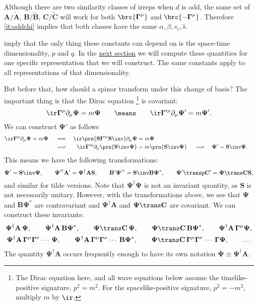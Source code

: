 \documentclass[11pt]{article}
\newcommand{\Gammab}{\boldsymbol{\Gamma}}
\renewcommand{\S}{\mathbf{S}}
\newcommand{\A}{\mathbf{A}}
\newcommand{\B}{\mathbf{B}}
\renewcommand{\C}{\mathbf{C}}
\newcommand{\At}{\widetilde{\A}}
\newcommand{\Bt}{\widetilde{\B}}
\newcommand{\Ct}{\widetilde{\C}}
\newcommand{\Psib}{\boldsymbol{\Psi}}
\begin{document}
Although there are two similarity classes of irreps when $d$ is odd, the same set of $\A/\At$, $\B/\Bt$, $\C/\Ct$ will work for both $\brc{\Gammab^\mu}$ and $\brc{ -\Gammab^\mu }$.
Therefore \cref{it:oddchi} implies that both classes have the same $\alpha, \beta, s_i, \hat{s}$.

 imply that the only thing these constants can depend on is the space-time dimensionality, $p$ and $q$.
In the \hyperref[sec:explicit]{next section} we will compute these quantities for one specific representation that we will construct.
The same constants apply to all representations of that dimensionality.

But before that, how should a spinor transform under this change of basis?
The important thing is that the Dirac equation%
\footnote{The Dirac equation here, and all wave equations below assume the timelike-positive signature, \(p^2 = m^2\).
For the spacelike-positive signature, \(p^2 = - m^2\), multiply \(m\) by \(\ir\).} 
is covariant:
%
\begin{equation*}
  \ir \Gammab^\mu \partial_\mu \Psib = m \Psib
  \qquad \means \qquad
  \ir \Gammab'^\mu \partial_\mu \Psib' = m \Psib'.
\end{equation*}
%
We can construct $\Psib'$ as follows
%
\begin{equation*}
\begin{aligned}
  \ir \Gammab^\mu \partial_\mu \Psib &= m \Psib &
  &\implies &
  \ir \prn{\S \Gammab'^\mu \S\inv} \partial_\mu \Psib &= m \Psib \\ &&
  &\implies &
  \ir \Gammab'^\mu \partial_\mu \prn{\S\inv\Psib} &= m \prn{\S\inv\Psib} &
  &\implies &
  \Psib' &= \S\inv \Psib.
\end{aligned}
\end{equation*}
%
This means we have the following transformations:
%
\begin{equation}\label{eq:spinorbasis}
  \Psib' = \S\inv \Psib, \qquad
  \Psib'^\dag \A' = \Psib^\dag \A \S, \qquad
  \B' \Psib'^\ast = \S\inv \B \Psib^\ast, \qquad
  \Psib'\transp \C' = \Psib\trans \C \S,
\end{equation}
%
and similar for tilde versions.
Note that $\Psib^\dag \Psib$ is not an invariant quantity, as \(\S\) is not necessarily unitary.
However, with the transformations above, we see that $\Psib$ and $\B \Psib^\ast$ are contravariant and $\Psib^\dag\A$ and $\Psib\trans \C$ are covariant.
We can construct these invariants:
%
\begin{equation}\label{eq:spinorinvt}
\begin{gathered}
  \Psib^\dag \A\, \Psib, \qquad
  \Psib^\dag \A\, \B \Psib^\ast, \qquad
  \Psib\trans \C\, \Psib, \qquad
  \Psib\trans \C\, \B \Psib^\ast, \qquad
  \Psib^\dag \A\, \Gammab^\mu \Psib, \\
  \Psib^\dag \A\, \Gammab^\mu \Gammab^\nu \cdots\, \Psib, \qquad
  \Psib^\dag \A\, \Gammab^\mu \Gammab^\nu \cdots\, \B \Psib^\ast, \qquad
  \Psib\trans \C\, \Gammab^\mu \Gammab^\nu \cdots\, \Gammab \Psib, \qquad
  \ldots
\end{gathered}
\end{equation}
%
The quantity \( \Psib^\dag \A \) occurs frequently enough to have its own notation \( \overline{\Psib} \equiv \Psib^\dag \A \).
\end{document}

